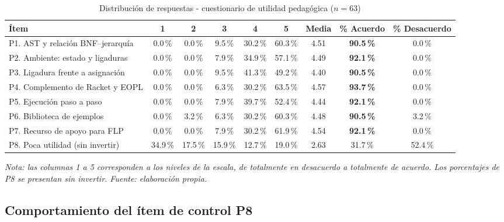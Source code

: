 \begin{table}[H]
  \centering
  \caption{Distribución de respuestas - cuestionario de utilidad pedagógica ($n = 63$)}
  \label{tabla:utilidad_items}
  \footnotesize
  \setlength{\tabcolsep}{3pt}
  \begin{tabular}{>{\raggedright\arraybackslash}p{4.2cm} c c c c c c c c}
    \hline
    \textbf{Ítem} & \textbf{1} & \textbf{2} & \textbf{3} & \textbf{4} & \textbf{5} & \textbf{Media} & \textbf{\% Acuerdo} & \textbf{\% Desacuerdo} \\
    \hline
    P1. AST y relación BNF--jerarquía & 0.0\,\% & 0.0\,\% & 9.5\,\% & 30.2\,\% & 60.3\,\% & 4.51 & \textbf{90.5\,\%} & 0.0\,\% \\
    P2. Ambiente: estado y ligaduras & 0.0\,\% & 0.0\,\% & 7.9\,\% & 34.9\,\% & 57.1\,\% & 4.49 & \textbf{92.1\,\%} & 0.0\,\% \\
    P3. Ligadura frente a asignación & 0.0\,\% & 0.0\,\% & 9.5\,\% & 41.3\,\% & 49.2\,\% & 4.40 & \textbf{90.5\,\%} & 0.0\,\% \\
    P4. Complemento de Racket y EOPL & 0.0\,\% & 0.0\,\% & 6.3\,\% & 30.2\,\% & 63.5\,\% & 4.57 & \textbf{93.7\,\%} & 0.0\,\% \\
    P5. Ejecución paso a paso & 0.0\,\% & 0.0\,\% & 7.9\,\% & 39.7\,\% & 52.4\,\% & 4.44 & \textbf{92.1\,\%} & 0.0\,\% \\
    P6. Biblioteca de ejemplos & 0.0\,\% & 3.2\,\% & 6.3\,\% & 30.2\,\% & 60.3\,\% & 4.48 & \textbf{90.5\,\%} & 3.2\,\% \\
    P7. Recurso de apoyo para FLP & 0.0\,\% & 0.0\,\% & 7.9\,\% & 30.2\,\% & 61.9\,\% & 4.54 & \textbf{92.1\,\%} & 0.0\,\% \\
    P8. Poca utilidad (sin invertir) & 34.9\,\% & 17.5\,\% & 15.9\,\% & 12.7\,\% & 19.0\,\% & 2.63 & 31.7\,\% & 52.4\,\% \\
    \hline
  \end{tabular}

  \vskip 4pt
  \footnotesize\textit{Nota: las columnas 1 a 5 corresponden a los niveles de la escala, de totalmente en desacuerdo a totalmente de acuerdo. Los porcentajes de P8 se presentan sin invertir. Fuente: elaboración propia.}
\end{table}

\FloatBarrier

\subsection{Comportamiento del ítem de control P8}

